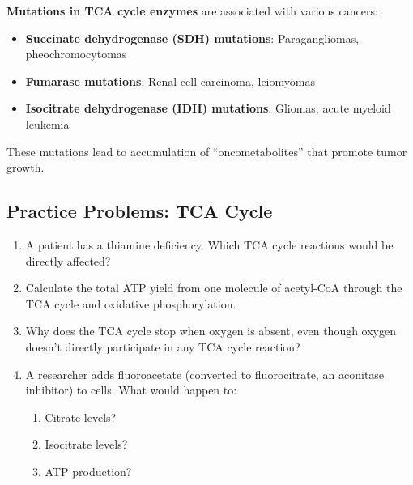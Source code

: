 \begin{tcolorbox}[colback=green!5, colframe=green!70!black, title=\textbf{Clinical Correlation: TCA Cycle Defects}]
\textbf{Mutations in TCA cycle enzymes} are associated with various cancers:
\begin{itemize}
    \item \textbf{Succinate dehydrogenase (SDH) mutations}: Paragangliomas, pheochromocytomas
    \item \textbf{Fumarase mutations}: Renal cell carcinoma, leiomyomas
    \item \textbf{Isocitrate dehydrogenase (IDH) mutations}: Gliomas, acute myeloid leukemia
\end{itemize}
These mutations lead to accumulation of ``oncometabolites'' that promote tumor growth.
\end{tcolorbox}

\subsection{Practice Problems: TCA Cycle}

\begin{enumerate}
    \item A patient has a thiamine deficiency. Which TCA cycle reactions would be directly affected?
    
    \item Calculate the total ATP yield from one molecule of acetyl-CoA through the TCA cycle and oxidative phosphorylation.
    
    \item Why does the TCA cycle stop when oxygen is absent, even though oxygen doesn't directly participate in any TCA cycle reaction?
    
    \item A researcher adds fluoroacetate (converted to fluorocitrate, an aconitase inhibitor) to cells. What would happen to:
    \begin{enumerate}
        \item Citrate levels?
        \item Isocitrate levels?
        \item ATP production?
    \end{enumerate}
\end{enumerate}

